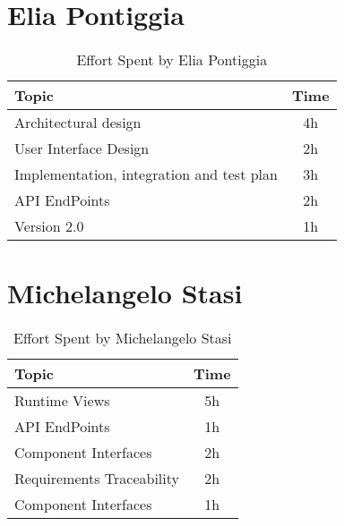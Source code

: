 \section*{Elia Pontiggia}
\begin{table}[H]
    \renewcommand{\arraystretch}{1.5}
    \centering
    \begin{tabular}{|l|c|}
        \hline
        \textbf{Topic}                            & \textbf{Time} \\ \hline
        Architectural design                      & 4h            \\ \hline
        User Interface Design                     & 2h            \\ \hline
        Implementation, integration and test plan & 3h            \\ \hline
        API EndPoints                             & 2h            \\ \hline
        Version 2.0                               & 1h            \\ \hline
    \end{tabular}
    \caption{Effort Spent by Elia Pontiggia}
    \label{tab:pontiggia-effort-spent}
\end{table}

\section*{Michelangelo Stasi}
\begin{table}[H]
    \renewcommand{\arraystretch}{1.5}
    \centering
    \begin{tabular}{|l|c|}
        \hline
        \textbf{Topic}            & \textbf{Time} \\ \hline
        Runtime Views             & 5h            \\ \hline
        API EndPoints             & 1h            \\ \hline
        Component Interfaces      & 2h            \\ \hline
        Requirements Traceability & 2h            \\ \hline
        Component Interfaces      & 1h            \\ \hline
    \end{tabular}
    \caption{Effort Spent by Michelangelo Stasi}
    \label{tab:stasi-effort-spent}
\end{table}
